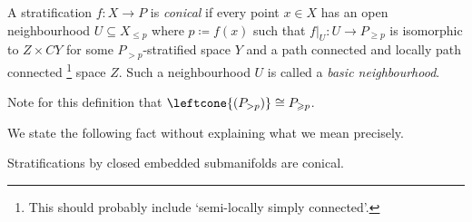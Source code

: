 \begin{defn}
A stratification \(f\colon X\to P\) is \emph{conical} if every point \(x\in X\) has an open neighbourhood \(U\subseteq X_{\leq p}\) where \(p\coloneq f(x)\) such that \(f|_U\colon U\to P_{\geq p}\) is isomorphic to \(Z\times CY\) for some \(P_{>p}\)-stratified space \(Y\) and a path connected and locally path connected \footnote{This should probably include `semi-locally simply connected'.} space \(Z\).
Such a neighbourhood \(U\) is called a \emph{basic neighbourhood}.
\end{defn}

Note for this definition that \(\leftcone{(P_{>p})}\cong P_{\geq p}\).

We state the following fact without explaining what we mean precisely.
\begin{prop}
Stratifications by closed embedded submanifolds are conical.
\end{prop}



